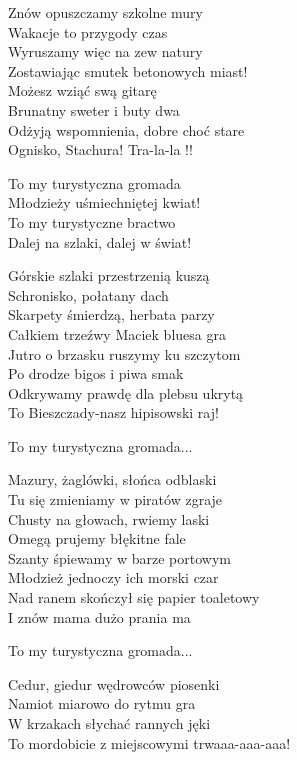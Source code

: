 \begin{text}
    Znów opuszczamy szkolne mury\\
    Wakacje to przygody czas\\
    Wyruszamy więc na zew natury\\
    Zostawiając smutek betonowych miast!\\
    Możesz wziąć swą gitarę\\
    Brunatny sweter i buty dwa\\
    Odżyją wspomnienia, dobre choć stare\\
    Ognisko, Stachura! Tra-la-la !!

    \vin To my turystyczna gromada\\
    \vin Młodzieży uśmiechniętej kwiat!\\
    \vin To my turystyczne bractwo\\
    \vin Dalej na szlaki, dalej w świat!

    Górskie szlaki przestrzenią kuszą\\
    Schronisko, połatany dach\\
    Skarpety śmierdzą, herbata parzy\\
    Całkiem trzeźwy Maciek bluesa gra\\
    Jutro o brzasku ruszymy ku szczytom\\
    Po drodze bigos i piwa smak\\
    Odkrywamy prawdę dla plebsu ukrytą\\
    To Bieszczady-nasz hipisowski raj! 

    \vin To my turystyczna gromada...

    Mazury, żaglówki, słońca odblaski\\
    Tu się zmieniamy w piratów zgraje\\
    Chusty na głowach, rwiemy laski\\
    Omegą prujemy błękitne fale\\
    Szanty śpiewamy w barze portowym\\
    Młodzież jednoczy ich morski czar\\
    Nad ranem skończył się papier toaletowy\\
    I znów mama dużo prania ma

    \vin To my turystyczna gromada...

    Cedur, giedur wędrowców piosenki\\
    Namiot miarowo do rytmu gra\\
    W krzakach słychać rannych jęki\\
    To mordobicie z miejscowymi trwaaa-aaa-aaa!
    

\end{text}
